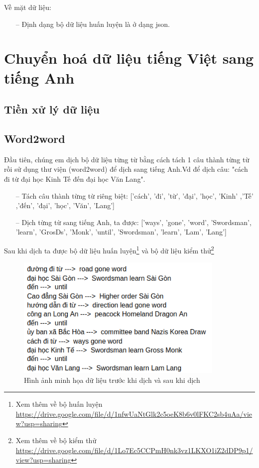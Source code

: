Về mặt dữ liệu:
\begin{itemize}
    \item[--] Định dạng bộ dữ liệu huấn luyện là ở dạng json.
\end{itemize}

\section{Chuyển hoá dữ liệu tiếng Việt sang tiếng Anh}
\subsection{Tiền xử lý dữ liệu}


\subsection{Word2word}

Đầu tiên, chúng em dịch bộ dữ liệu từng từ bằng cách tách 1 câu thành từng từ rồi sử dụng thư viện (word2word) để dịch sang tiếng Anh.Vd để dịch câu: "cách đi từ đại học Kinh Tế đến đại học Văn Lang".
\begin{itemize}
    \item[--] Tách câu thành từng từ riêng biệt: ['cách', 'đi', 'từ', 'đại', 'học', 'Kinh' ,'Tế' ,'đến', 'đại', 'học', 'Văn', 'Lang']
    \item[--] Dịch từng từ sang tiếng Anh, ta được: ['ways', 'gone', 'word', 'Swordsman', 'learn', 'GrosDs', 'Monk', 'until', 'Swordsman', 'learn', 'Lam', 'Lang']
\end{itemize}

Sau khi dịch ta được bộ dữ liệu huấn luyện\footnote{Xem thêm về bộ huấn luyện \url{https://drive.google.com/file/d/1nfwUaNtGlk2c5oeK8b6v0lFKC2sb4uAa/view?usp=sharing}} và bộ dữ liệu kiểm thử\footnote{Xem thêm về bộ kiểm thử \url{https://drive.google.com/file/d/1Lo7Ec5CCPmH0nk3vz1LKXO1iZ2dDP9p1/view?usp=sharing}}
\begin{figure}[htp]
    \centering
    \includegraphics[width=10cm]{images/trainingdata_dichtungtu.png}
    \caption{Hình ảnh minh họa dữ liệu trước khi dịch và sau khi dịch}
    \label{fig:sodohethongchiduong}
\end{figure}

